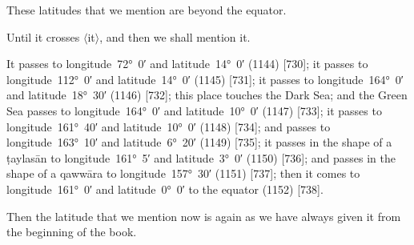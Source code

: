 \documentclass[11pt]{article}
\newcommand{\Pg}[1]{\marginpar{\footnotesize #1}}
\newcommand{\Ang}[1]{\ensuremath{#1}}
\begin{document}
These latitudes that we mention are beyond the equator.

Until it crosses \Ang{\langle}it\Ang{\rangle}, and then we shall mention it.

It passes to longitude~72°~0′ and latitude~14°~0′ (1144) [730]; it passes to longitude~112°~0′ and latitude~14°~0′ (1145) [731]; it passes to longitude~164°~0′ and latitude~18°~30′ (1146) [732]; this place touches the Dark Sea; and the Green Sea passes to longitude~164°~0′ and latitude~10°~0′ (1147) [733]; it passes to longitude~161°~40′ and latitude~10°~0′ (1148) [734]; and passes to longitude~163°~10′ and latitude~6°~20′ (1149) [735]; it passes in the shape of a ṭaylasān to longitude~161°~5′ and latitude~3°~0′ (1150) [736]\Pg{p. 76}; and passes in the shape of a qawwāra to longitude~157°~30′ (1151) [737]; then it comes to longitude~161°~0′ and latitude~0°~0′ to the equator (1152) [738].

Then the latitude that we mention now is again as we have always given it from the beginning of the book.
\end{document}
